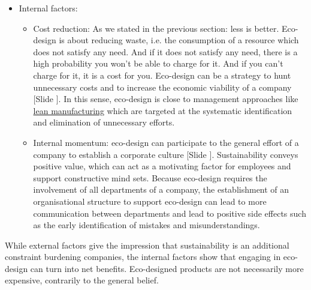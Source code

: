 \documentclass{article}
\newcounter{slide}
\begin{document}
\begin{itemize}
\begin{itemize}
	\end{itemize}
	\item Internal factors:
	\begin{itemize}
		\item Cost reduction: As we stated in the previous section: less is better. Eco-design is about reducing waste, i.e. the consumption of a resource which does not satisfy any need. And if it does not satisfy any need, there is a high probability you won't be able to charge for it. And if you can't charge for it, it is a cost for you. Eco-design can be a strategy to hunt unnecessary costs and to increase the economic viability of a company {\color{blue}[Slide ]}. In this sense, eco-design is close to management approaches like \href{https://en.wikipedia.org/wiki/Lean_manufacturing}{lean manufacturing} which are targeted at the systematic identification and elimination of unnecessary efforts. 
		\item Internal momentum: eco-design can participate to the general effort of a company to establish a corporate culture {\color{blue}[Slide ]}. Sustainability conveys positive value, which can act as a motivating factor for employees and support constructive mind sets. Because eco-design requires the involvement of all departments of a company, the establishment of an organisational structure to support eco-design can lead to more communication between departments and lead to positive side effects such as the early identification of mistakes and misunderstandings. 
	\end{itemize}
\end{itemize}
While external factors give the impression that sustainability is an additional constraint burdening companies, the internal factors show that engaging in eco-design can turn into net benefits. Eco-designed products are not necessarily more expensive, contrarily to the general belief.
\end{document}
